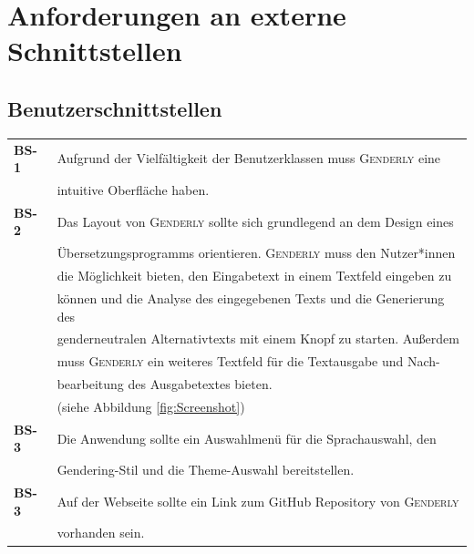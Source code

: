 \documentclass[paper=a4, parskip=half]{scrreprt}
\newcommand{\Genderly}{\textsc{Genderly}}
\begin{document}
\chapter{Anforderungen an externe Schnittstellen}
\section{Benutzerschnittstellen} \label{Benutzerschnittstellen}
\begin{table}[!htb]
\begin{tabular}{ll}
\textbf{BS-1} & Aufgrund der Vielfältigkeit der Benutzerklassen muss \Genderly{} eine \\
& intuitive Oberfläche haben. \vspace{0.15cm} \\
\textbf{BS-2} & Das Layout von \Genderly{} sollte sich grundlegend an dem Design eines \\
& Übersetzungsprogramms orientieren. \Genderly{} muss den Nutzer*innen \\
& die Möglichkeit bieten, den Eingabetext in einem Textfeld eingeben zu \\
& können und die Analyse des eingegebenen Texts und die Generierung des \\
& genderneutralen Alternativtexts mit einem Knopf zu starten. Außerdem \\
& muss \Genderly{} ein weiteres Textfeld für die Textausgabe und Nach- \\
& bearbeitung des Ausgabetextes bieten. \\
& (siehe Abbildung \ref{fig:Screenshot}) \vspace{0.15cm} \\
\textbf{BS-3} & Die Anwendung sollte ein Auswahlmenü für die Sprachauswahl, den \\
& Gendering-Stil und die Theme-Auswahl bereitstellen. \vspace{0.15cm}\\ 
\textbf{BS-3} & Auf der Webseite sollte ein Link zum GitHub Repository von \Genderly{} \\
& vorhanden sein. \vspace{0.15cm}\\
\end{tabular}
\end{table}
\end{document}
